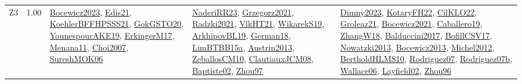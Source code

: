 {\begin{longtable}{p{3cm}r>{\raggedright\arraybackslash}p{6cm}>{\raggedright\arraybackslash}p{6cm}>{\raggedright\arraybackslash}p{8cm}}
\index{Z3}\index{CPSystems!Z3}Z3 &  1.00 & \hyperref[detail:Bocewicz2023]{Bocewicz2023}, \hyperref[detail:Edis21]{Edis21}, \hyperref[detail:KoehlerBFFHPSSS21]{KoehlerBFFHPSSS21}, \hyperref[detail:GokGSTO20]{GokGSTO20}, \hyperref[detail:YounespourAKE19]{YounespourAKE19}, \hyperref[detail:ErkingerM17]{ErkingerM17}, \hyperref[detail:Menana11]{Menana11}, \hyperref[detail:Choi2007]{Choi2007}, \hyperref[detail:SureshMOK06]{SureshMOK06} & \hyperref[detail:NaderiRR23]{NaderiRR23}, \hyperref[detail:Grzegorz2021]{Grzegorz2021}, \hyperref[detail:Radzki2021]{Radzki2021}, \hyperref[detail:VlkHT21]{VlkHT21}, \hyperref[detail:WikarekS19]{WikarekS19}, \hyperref[detail:ArkhipovBL19]{ArkhipovBL19}, \hyperref[detail:German18]{German18}, \hyperref[detail:LimBTBB15a]{LimBTBB15a}, \hyperref[detail:Austrin2013]{Austrin2013}, \hyperref[detail:ZeballosCM10]{ZeballosCM10}, \hyperref[detail:ClautiauxJCM08]{ClautiauxJCM08}, \hyperref[detail:Baptiste02]{Baptiste02}, \hyperref[detail:Zhou97]{Zhou97} & \hyperref[detail:Dimny2023]{Dimny2023}, \hyperref[detail:KotaryFH22]{KotaryFH22}, \hyperref[detail:CilKLO22]{CilKLO22}, \hyperref[detail:Groleaz21]{Groleaz21}, \hyperref[detail:Bocewicz2021]{Bocewicz2021}, \hyperref[detail:Caballero19]{Caballero19}, \hyperref[detail:ZhangW18]{ZhangW18}, \hyperref[detail:Balduccini2017]{Balduccini2017}, \hyperref[detail:BofillCSV17]{BofillCSV17}, \hyperref[detail:Nowatzki2013]{Nowatzki2013}, \hyperref[detail:Bocewicz2013]{Bocewicz2013}, \hyperref[detail:Michel2012]{Michel2012}, \hyperref[detail:BertholdHLMS10]{BertholdHLMS10}, \hyperref[detail:Rodriguez07]{Rodriguez07}, \hyperref[detail:Rodriguez07b]{Rodriguez07b}, \hyperref[detail:Wallace06]{Wallace06}, \hyperref[detail:Layfield02]{Layfield02}, \hyperref[detail:Zhou96]{Zhou96}\\
\end{longtable}
}

\clearpage

